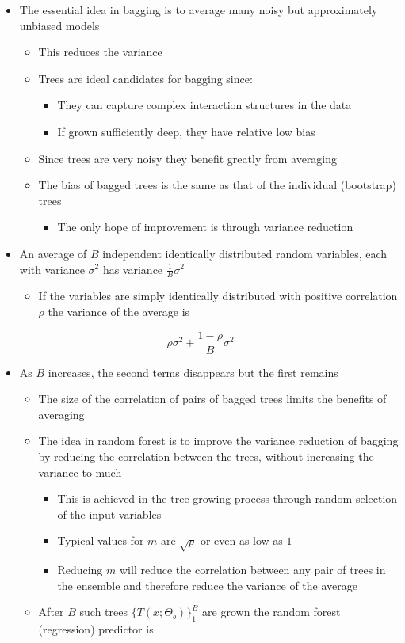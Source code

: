 \documentclass[11pt]{article}
\begin{document}
\begin{itemize}
\item The essential idea in bagging is to average many noisy but approximately unbiased models
\begin{itemize}
\item This reduces the variance
\item Trees are ideal candidates for bagging since:
\begin{itemize}
\item They can capture complex interaction structures in the data
\item If grown sufficiently deep, they have relative low bias
\end{itemize}
\item Since trees are very noisy they benefit greatly from averaging
\item The bias of bagged trees is the same as that of the individual (bootstrap) trees
\begin{itemize}
\item The only hope of improvement is through variance reduction
\end{itemize}
\end{itemize}

\item An average of \(B\) independent identically distributed random variables, each with variance \(\sigma ^2\) has variance \(\frac1B\sigma^2\)
\begin{itemize}
\item If the variables are simply identically distributed with positive correlation \(\rho\) the variance of the average is
\end{itemize}
\end{itemize}
\begin{equation}
  \rho \sigma^2 + \frac{1-\rho}B \sigma^2
\end{equation}
\begin{itemize}
\item As \(B\) increases, the second terms disappears but the first remains
\begin{itemize}
\item The size of the correlation of pairs of bagged trees limits the benefits of averaging
\item The idea in random forest is to improve the variance reduction of bagging by reducing the correlation between the trees, without increasing the variance to much
\begin{itemize}
\item This is achieved in the tree-growing process through random selection of the input variables
\item Typical values for \(m\) are \(\sqrt p\) or even as low as \(1\)
\item Reducing \(m\) will reduce the correlation between any pair of trees in the ensemble and therefore reduce the variance of the average
\end{itemize}
\item After \(B\) such trees \(\{T(x;\Theta_b)\}^B_1\) are grown the random forest (regression) predictor is
\end{itemize}
\end{itemize}
\end{document}
